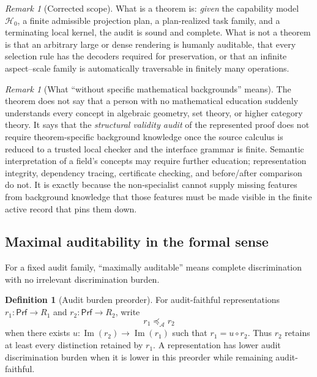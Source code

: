 \documentclass[11pt]{article}
\newcommand{\Prf}{\mathsf{Prf}}
\newcommand{\Img}{\operatorname{Im}}
\newcommand{\mcA}{\mathcal A}
\newcommand{\mcH}{\mathcal H_0}
\theoremstyle{plain}
\theoremstyle{definition}
\newtheorem{definition}[theorem]{Definition}
\theoremstyle{remark}
\newtheorem{remark}[theorem]{Remark}
\begin{document}
\begin{remark}[Corrected scope]
\label{rem:disclaimer-to-hyp}
What is a theorem is: \emph{given} the capability model $\mcH$, a finite
admissible projection plan, a plan-realized task family, and a terminating local
kernel, the audit is sound and complete.  What is not a theorem is that an
arbitrary large or dense rendering is humanly auditable, that every selection
rule has the decoders required for preservation, or that an infinite
aspect--scale family is automatically traversable in finitely many operations.
\end{remark}

\begin{remark}[What ``without specific mathematical backgrounds'' means]
\label{rem:background}
The theorem does not say that a person with no mathematical education suddenly
understands every concept in algebraic geometry, set theory, or higher category
theory.  It says that the \emph{structural validity audit} of the represented
proof does not require theorem-specific background knowledge once the source
calculus is reduced to a trusted local checker and the interface grammar is
finite.  Semantic interpretation of a field's concepts may require further
education; representation integrity, dependency tracing, certificate checking,
and before/after comparison do not.  It is exactly because the non-specialist
cannot supply missing features from background knowledge that those features
must be made visible in the finite active record that pins them down.
\end{remark}

\subsection{Maximal auditability in the formal sense}

For a fixed audit family, ``maximally auditable'' means complete discrimination with no irrelevant discrimination burden.

\begin{definition}[Audit burden preorder]
\label{def:burden}
For audit-faithful representations $r_1:\Prf\to R_1$ and $r_2:\Prf\to R_2$, write
\[
  r_1\preceq_{\mcA} r_2
\]
when there exists $u:\Img(r_2)\to\Img(r_1)$ such that $r_1=u\circ r_2$.  Thus $r_2$ retains at least every distinction retained by $r_1$.  A representation has lower audit discrimination burden when it is lower in this preorder while remaining audit-faithful.
\end{definition}
\end{document}
